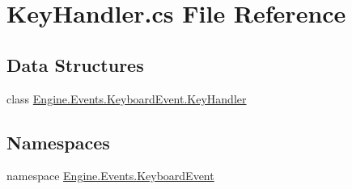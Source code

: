 \hypertarget{a00056}{}\section{Key\+Handler.\+cs File Reference}
\label{a00056}
\subsection*{Data Structures}
\begin{DoxyCompactItemize}
\item 
class \hyperlink{a00366}{Engine.\+Events.\+Keyboard\+Event.\+Key\+Handler}
\end{DoxyCompactItemize}
\subsection*{Namespaces}
\begin{DoxyCompactItemize}
\item 
namespace \hyperlink{a00247}{Engine.\+Events.\+Keyboard\+Event}
\end{DoxyCompactItemize}
